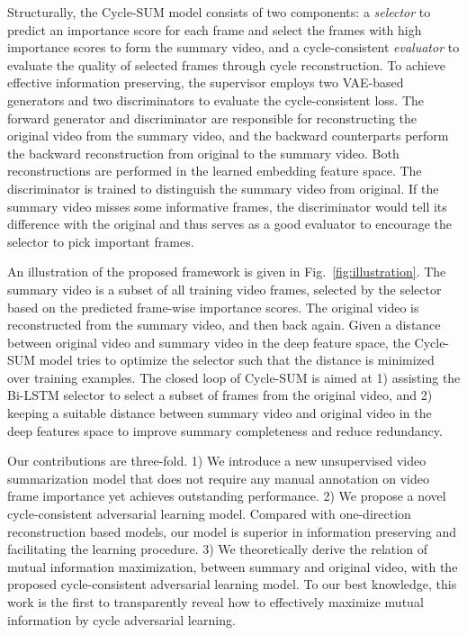 \documentclass[letterpaper]{article} \usepackage{aaai19}  \usepackage{times}  \usepackage{helvet}  \usepackage{courier}  \usepackage{url}  \usepackage{graphicx}  \frenchspacing  \setlength{\pdfpagewidth}{8.5in}  \setlength{\pdfpageheight}{11in}  \usepackage{amsmath}
\begin{document}
Structurally, the Cycle-SUM model consists of two components: a \emph{selector} to predict an importance score for each frame and select the frames with high importance scores to form the summary video, and a cycle-consistent \emph{evaluator} to  evaluate the quality of selected frames through cycle reconstruction. To achieve effective information preserving, the supervisor employs two VAE-based generators and two discriminators to evaluate the cycle-consistent loss. The forward generator and discriminator are responsible for reconstructing the original video from the summary video, and the backward counterparts perform the backward reconstruction from original to the summary video. Both reconstructions are performed in the learned embedding feature space. The discriminator is trained to distinguish the summary video from original. If the summary video misses some informative frames, the discriminator would tell its difference with the original and thus serves as a good evaluator to encourage the selector to pick important frames.


An illustration of the proposed framework is given in Fig.~\ref{fig:illustration}. The summary video is a subset of all training video frames, selected by the selector based on the predicted frame-wise importance scores. The original video is reconstructed from the summary video, and then back again. Given a distance between original video and summary video in the deep feature space, the Cycle-SUM model tries to optimize the selector such that the distance is minimized over training examples. The closed loop of Cycle-SUM is aimed at 1) assisting the Bi-LSTM selector to select a subset of frames from the original video, and 2) keeping a suitable distance between summary video and original video in the deep features space to improve summary completeness and reduce redundancy.



Our contributions are three-fold.
1) We introduce a new unsupervised video summarization model that does not require any manual annotation on video frame importance yet achieves outstanding performance. 2)
We propose a novel cycle-consistent adversarial learning model. Compared with one-direction reconstruction based models, our model is superior in information preserving and facilitating the learning procedure.
3) We theoretically derive the relation of mutual information maximization, between summary and original video, with the proposed cycle-consistent adversarial learning model. To our best knowledge, this work is the first to transparently reveal how to effectively maximize mutual information by cycle adversarial learning.
\end{document}
